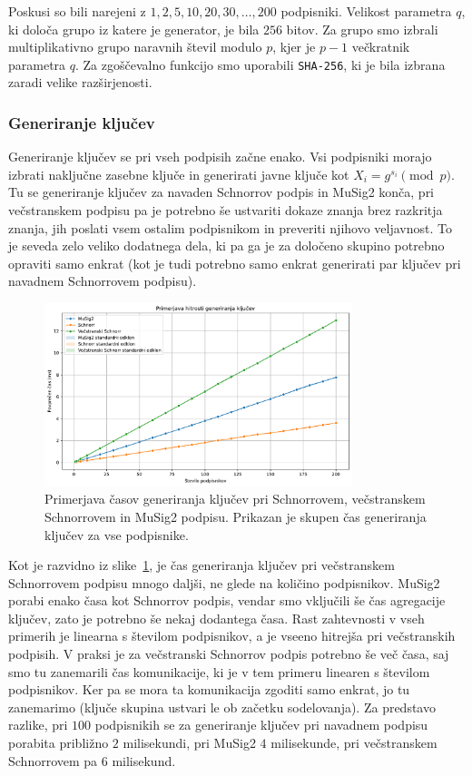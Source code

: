 Poskusi so bili narejeni z $1, 2, 5, 10, 20, 30, \dots, 200$ podpisniki. Velikost parametra $q$, ki
določa grupo iz katere je generator, je bila $256$ bitov. Za grupo smo izbrali multiplikativno grupo
naravnih števil modulo $p$, kjer je $p-1$ večkratnik parametra $q$. Za zgoščevalno funkcijo smo
uporabili \texttt{SHA-256}, ki je bila izbrana zaradi velike razširjenosti.

\subsubsection{Generiranje ključev}
Generiranje ključev se pri vseh podpisih začne enako. Vsi podpisniki morajo izbrati naključne zasebne
ključe in generirati javne ključe kot $X_i = g^{s_i} \pmod p$. Tu se generiranje ključev za navaden
Schnorrov podpis in MuSig2 konča, pri večstranskem podpisu pa je potrebno še ustvariti dokaze znanja brez
razkritja znanja, jih poslati vsem ostalim podpisnikom in preveriti njihovo veljavnost. To je seveda
zelo veliko dodatnega dela, ki pa ga je za določeno skupino potrebno opraviti samo enkrat (kot je
tudi potrebno samo enkrat generirati par ključev pri navadnem Schnorrovem podpisu).

\begin{figure}[ht]
  \centering
  \includegraphics[width=0.8\textwidth]{images/benchmark_KeyGeneration.pdf}
  \caption[Generiranje ključev.]{Primerjava časov generiranja ključev pri Schnorrovem, večstranskem
    Schnorrovem in MuSig2 podpisu. Prikazan je skupen čas generiranja ključev za vse podpisnike.}
  \label{fig:generiranje}
\end{figure}

Kot je razvidno iz slike~\ref{fig:generiranje}, je čas generiranja ključev pri večstranskem Schnorrovem
podpisu mnogo daljši, ne glede na količino podpisnikov. MuSig2 porabi enako časa kot Schnorrov podpis,
vendar smo vključili še čas agregacije ključev, zato je potrebno še nekaj dodantega časa. Rast
zahtevnosti v vseh primerih je linearna s številom podpisnikov, a je vseeno hitrejša pri večstranskih
podpisih. V praksi je za večstranski Schnorrov podpis potrebno še več časa, saj smo tu zanemarili čas
komunikacije, ki je v tem primeru linearen s številom podpisnikov. Ker pa se mora ta komunikacija
zgoditi samo enkrat, jo tu zanemarimo (ključe skupina ustvari le ob začetku sodelovanja). Za predstavo
razlike, pri $100$ podpisnikih se za generiranje ključev pri navadnem podpisu porabita približno $2$
milisekundi, pri MuSig2 $4$ milisekunde, pri večstranskem Schnorrovem pa $6$ milisekund.

